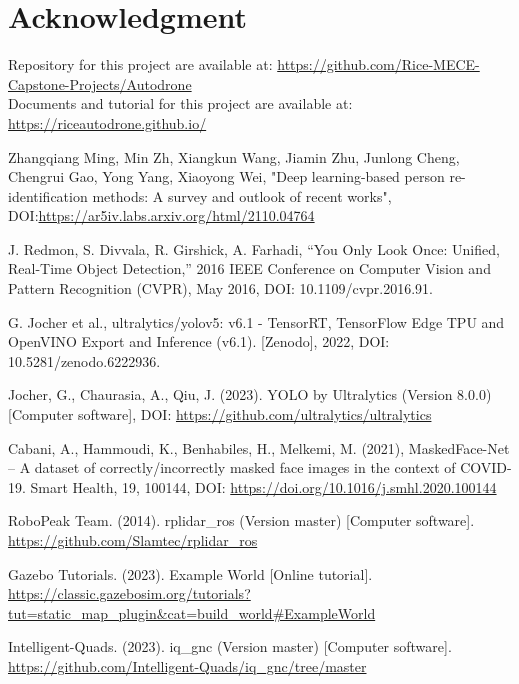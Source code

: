 \section*{Acknowledgment}

Repository for this project are available at: \url{https://github.com/Rice-MECE-Capstone-Projects/Autodrone} \\

Documents and tutorial for this project are available at: \url{https://riceautodrone.github.io/} \\


\begin{thebibliography}{00} 
 Zhangqiang Ming, Min Zh, Xiangkun Wang, Jiamin Zhu, Junlong Cheng, Chengrui Gao, Yong Yang, Xiaoyong Wei, "Deep learning-based person re-identification methods: A survey and outlook of recent works", DOI:\url{https://ar5iv.labs.arxiv.org/html/2110.04764}

 J. Redmon, S. Divvala, R. Girshick, A. Farhadi, ``You Only Look Once: Unified, Real-Time Object Detection,'' 2016 IEEE Conference on Computer Vision and Pattern Recognition (CVPR), May 2016, DOI: 10.1109/cvpr.2016.91.

 G. Jocher et al., ultralytics/yolov5: v6.1 - TensorRT, TensorFlow Edge TPU and OpenVINO Export and Inference (v6.1). [Zenodo], 2022, DOI: 10.5281/zenodo.6222936.

 Jocher, G., Chaurasia, A., Qiu, J. (2023). YOLO by Ultralytics (Version 8.0.0) [Computer software], DOI: \url{https://github.com/ultralytics/ultralytics}

 Cabani, A., Hammoudi, K., Benhabiles, H., Melkemi, M. (2021), MaskedFace-Net – A dataset of correctly/incorrectly masked face images in the context of COVID-19. Smart Health, 19, 100144, DOI: \url{https://doi.org/10.1016/j.smhl.2020.100144}

 RoboPeak Team. (2014). rplidar{\_}ros (Version master) [Computer software]. \url{https://github.com/Slamtec/rplidar_ros}

 Gazebo Tutorials. (2023). Example World [Online tutorial]. \url{https://classic.gazebosim.org/tutorials?tut=static_map_plugin&cat=build_world#ExampleWorld}

 Intelligent-Quads. (2023). iq{\_}gnc (Version master) [Computer software]. \url{https://github.com/Intelligent-Quads/iq_gnc/tree/master}


\end{thebibliography}
\vspace{12pt}


